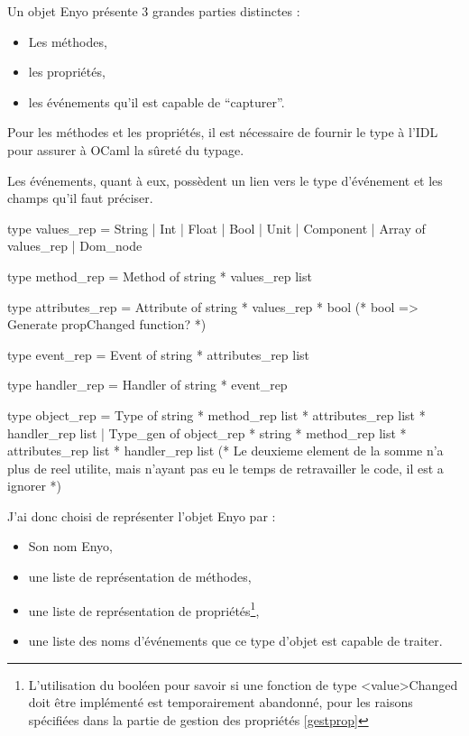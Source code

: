 \documentclass[11pt,a4paper]{report}
\begin{document}
Un objet Enyo présente 3 grandes parties distinctes :
\begin{itemize}
  \item Les méthodes,
  \item les propriétés,
  \item les événements qu'il est capable de ``capturer''.
\end{itemize}

Pour les méthodes et les propriétés, il est nécessaire de fournir le type à l'IDL pour assurer à
OCaml la sûreté du typage.

Les événements, quant à eux, possèdent un lien vers le type d'événement et les champs qu'il faut préciser.

\begin{OCaml}
type values_rep =  String | Int | Float | Bool | Unit 
		   | Component | Array of values_rep | Dom_node

type method_rep = Method of string * values_rep list

type attributes_rep = Attribute of string * values_rep * bool (* bool => Generate propChanged function? *)

type event_rep = Event of string * attributes_rep list

type handler_rep = Handler of string * event_rep

type object_rep = Type of string * method_rep list * attributes_rep list * handler_rep list
		  | Type_gen of object_rep * string * method_rep list * attributes_rep list * handler_rep list
                  (* Le deuxieme element de la somme n'a plus de reel utilite, mais n'ayant pas eu le temps
                  de retravailler le code, il est a ignorer *)
\end{OCaml}

J'ai donc choisi de représenter l'objet Enyo par :
\begin{itemize}
\item Son nom Enyo,
\item une liste de représentation de méthodes,
\item une liste de représentation de propriétés\footnote{L'utilisation du booléen pour savoir si 
une fonction de type <value>Changed doit être implémenté est temporairement abandonné, pour
les raisons spécifiées dans la partie de gestion des propriétés \ref{gestprop}},
\item une liste des noms d'événements que ce type d'objet est capable de traiter.
\end{itemize}
\end{document}
